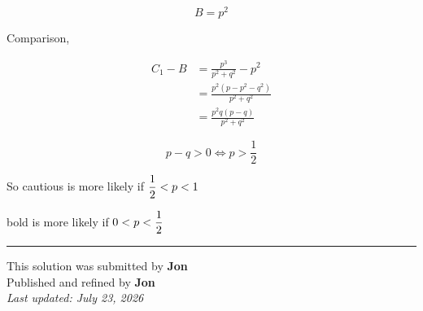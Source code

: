 \documentclass[12pt]{article}
\begin{document}
$$B=p^2$$

Comparison,

\begin{align*}
C_1-B
&=\frac{p^3}{p^2+q^2}-p^2\\
&=\frac{p^2(p-p^2-q^2)}{p^2+q^2}\\
&=\frac{p^2q(p-q)}{p^2+q^2}
\end{align*}

$$p-q>0\iff p>\frac12$$

So cautious is more likely if $\displaystyle \frac12<p<1$

bold is more likely if $\displaystyle 0<p<\frac12$

\bigskip
\hrule
\begin{center}
    This solution was submitted by \textbf{Jon}\\[4pt]
    Published and refined by \textbf{Jon}\\[8pt]
    \textit{Last updated: July 23, 2026}
\end{center}
\end{document}
